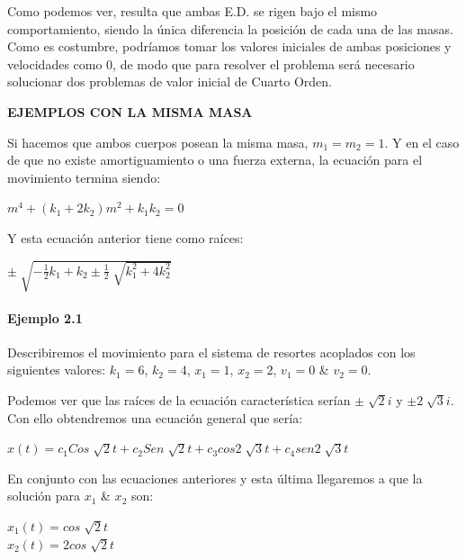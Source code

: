 Como podemos ver, resulta que ambas E.D. se rigen bajo el mismo comportamiento, siendo la única diferencia la posición de cada una de las masas.
Como es costumbre, podríamos tomar los valores iniciales de ambas posiciones y velocidades como 0, de modo que para resolver el problema será necesario solucionar dos problemas de valor inicial de Cuarto Orden. \\

\begin{center}
	\textbf{EJEMPLOS CON LA MISMA MASA}
\end{center}

\noindent Si hacemos que ambos cuerpos posean la misma masa, $m_1 = m_2 = 1$. Y en el caso de que no existe amortiguamiento o una fuerza externa, la ecuación para el movimiento termina siendo:

\begin{center}
	$m^{4} + (k_1 + 2k_2)m^{2} + k_1k_2 = 0$
\end{center}

Y esta ecuación anterior tiene como raíces:

\begin{center}
	$\pm \sqrt[]{-\frac{1}{2}k_1 + k_2 \pm\frac{1}{2}\sqrt[]{k_1^{2} + 4k_2^{2}} }$
\end{center}

\paragraph{\textbf{Ejemplo 2.1}}
Describiremos el movimiento para el sistema de resortes acoplados con los siguientes valores: $k_1 = 6$, $k_2 = 4$, $x_1 = 1$, $x_2 = 2$, $v_1 = 0$ \& $v_2 = 0$.

Podemos ver que las raíces de la ecuación característica serían $\pm\sqrt[]{2}i$ y $\pm2\sqrt[]{3}i$. Con ello obtendremos una ecuación general que sería:

\begin{center}
	$x(t) = c_1 Cos \sqrt[]{2} t + c_2 Sen \sqrt[]{2} t + c_3 cos 2\sqrt[]{3}t + c_4 sen2\sqrt[]{3}t$
\end{center}

En conjunto con las ecuaciones anteriores y esta última llegaremos a que la solución para $x_1$ \& $x_2$ son:

\begin{center}
	$x_1(t) = cos \sqrt[]{2}t$
    \\ $x_2(t) = 2 cos \sqrt[]{2}t$
\end{center}

